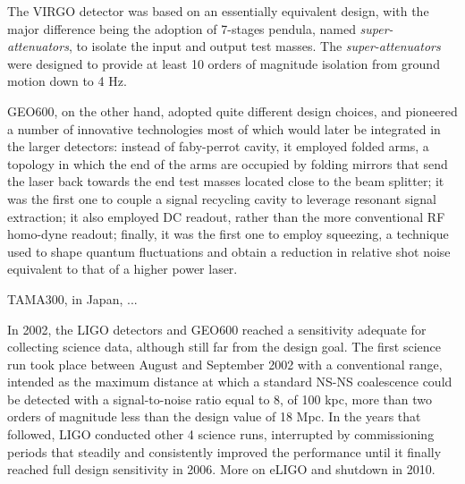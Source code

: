 The VIRGO detector was based on an essentially equivalent design, with the major difference being the adoption of 7-stages pendula, named \textit{super-attenuators}, to isolate the input and output test masses. The \textit{super-attenuators} were designed to provide at least 10 orders of magnitude isolation from ground motion down to 4 Hz.

GEO600, on the other hand, adopted quite different design choices, and pioneered a number of innovative technologies most of which would later be integrated in the larger detectors: instead of faby-perrot cavity, it employed folded arms, a topology in which the end of the arms are occupied by folding mirrors that send the laser back towards the end test masses located close to the beam splitter; it was the first one to couple a signal recycling cavity to leverage resonant signal extraction; it also employed DC readout, rather than the more conventional RF homo-dyne readout; finally, it was the first one to employ squeezing, a technique used to shape quantum fluctuations and obtain a reduction in relative shot noise equivalent to that of a higher power laser.

TAMA300, in Japan, ...

In 2002, the LIGO detectors and GEO600 reached a sensitivity adequate for collecting science data, although still far from the design goal. 
The first science run took place between August and September 2002 with a conventional range, intended as the maximum distance at which a standard NS-NS coalescence could be detected with a signal-to-noise ratio equal to 8, of 100 kpc, more than two orders of magnitude less than the design value of 18 Mpc. In the years that followed, LIGO conducted other 4 science runs, interrupted by commissioning periods that steadily and consistently improved the performance until it finally reached full design sensitivity in 2006. More on eLIGO and shutdown in 2010.






